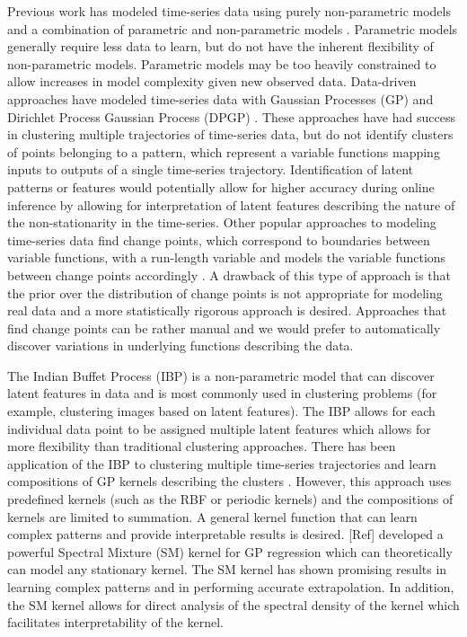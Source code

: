 \documentclass{article}
\begin{document}
Previous work has modeled time-series data using purely non-parametric models \cite{FastNonP} and a combination of parametric and non-parametric models \cite{StructDiscNonPara}. Parametric models generally require less data to learn, but do not have the inherent flexibility of non-parametric models. Parametric models may be too heavily constrained to allow increases in model complexity given new observed data. Data-driven approaches have modeled time-series data with Gaussian Processes (GP) and Dirichlet Process Gaussian Process (DPGP) \cite{DPGPwithConstraints}. These approaches have had success in clustering multiple trajectories of time-series data, but do not identify clusters of points belonging to a pattern, which represent a variable functions mapping inputs to outputs of a single time-series trajectory. Identification of latent patterns or features would potentially allow for higher accuracy during online inference by allowing for interpretation of latent features describing the nature of the non-stationarity in the time-series. Other popular approaches to modeling time-series data find change points, which correspond to boundaries between variable functions, with a run-length variable and models the variable functions between change points accordingly \cite{GPChangePointModels}. A drawback of this type of approach is that the prior over the distribution of change points is not appropriate for modeling real data and a more statistically rigorous approach is desired. Approaches that find change points can be rather manual and we would prefer to automatically discover variations in underlying functions describing the data.

The Indian Buffet Process (IBP) is a non-parametric model that can discover latent features in data and is most commonly used in clustering problems (for example, clustering images based on latent features). The IBP allows for each individual data point to be assigned multiple latent features which allows for more flexibility than traditional clustering approaches. There has been application of the IBP to clustering multiple time-series trajectories and learn compositions of GP kernels describing the clusters \cite{IBPGP}. However, this approach uses predefined kernels (such as the RBF or periodic kernels) and the compositions of kernels are limited to summation. A general kernel function that can learn complex patterns and provide interpretable results is desired. [Ref] developed a powerful Spectral Mixture (SM) kernel for GP regression which can theoretically can model any stationary kernel. The SM kernel has shown promising results in learning complex patterns and in performing accurate extrapolation. In addition, the SM kernel allows for direct analysis of the spectral density of the kernel which facilitates interpretability of the kernel.
\end{document}
